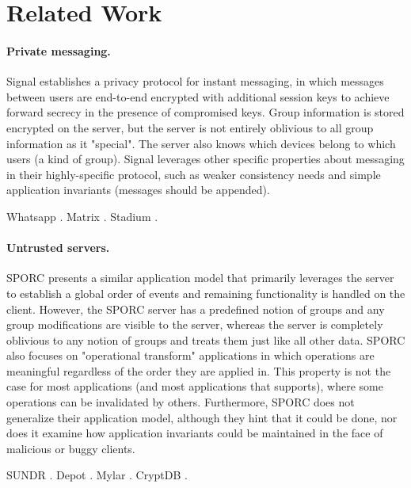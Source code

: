 \section{Related Work}

\paragraph{Private messaging.}
Signal \cite{signal} establishes a privacy protocol for instant messaging, in which messages between users are end-to-end encrypted with additional session keys to achieve forward secrecy in the presence of compromised keys. Group information is stored encrypted on the server, but the server is not entirely oblivious to all group information as it "special". The server also knows which devices belong to which users (a kind of group). Signal leverages other specific properties about messaging in their highly-specific protocol, such as weaker consistency needs and simple application invariants (messages should be appended).

Whatsapp \cite{whatsapp}.
Matrix \cite{matrix}.
Stadium \cite{stadium}.

\paragraph{Untrusted servers.}
SPORC \cite{sporc} presents a similar application model that primarily leverages the server to establish a global order of events and remaining functionality is handled on the client. However, the SPORC server has a predefined notion of groups and any group modifications are visible to the server, whereas the \name server is completely oblivious to any notion of groups and treats them just like all other data. SPORC also focuses on "operational transform" applications in which operations are meaningful regardless of the order they are applied in. This property is not the case for most applications (and most applications that \name supports), where some operations can be invalidated by others. Furthermore, SPORC does not generalize their application model, although they hint that it could be done, nor does it examine how application invariants could be maintained in the face of malicious or buggy clients. 

SUNDR \cite{sundr}.
Depot \cite{depot}.
Mylar \cite{mylar}.
CryptDB \cite{cryptdb}.

